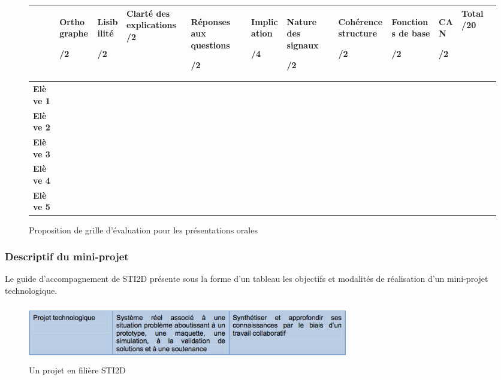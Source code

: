 \documentclass[12pt]{article}
\begin{document}
\begin{figure}[!h]
\hspace{-40pt}
\begin{tabular}%
{|>{\bfseries}l|p{1.8cm}|p{1.5cm}|p{1.5cm}|p{1.5cm}||p{1.5cm}|p{1.5cm}|p{1.5cm}|p{1.5cm}|p{1.5cm}|p{1.5cm}|p{1.5cm}|} \cline{2-11}
\multicolumn{1}{c|}{} & \scriptsize Orthographe \par \centering/2 &
\scriptsize Lisibilité \par \centering /2 &\scriptsize Clarté des explications  /2 & \scriptsize Réponses aux questions \par \centering /2 &\scriptsize Implication \par \centering /4 &\scriptsize Nature des signaux \par \centering /2 & \scriptsize Cohérence structure \par \centering /2 &\scriptsize Fonctions de base  \par \centering /2 & \scriptsize CAN \par \centering /2 & \scriptsize Total /20\\ \hline
Elève 1 & &&&&&&&&&   \\\hline Elève 2 &  & &&&&&&&&  \\\hline Elève 3 & & &&&&&&&& \\\hline Elève 4 & & &&&&&&&& \\\hline Elève 5 & & &&&&&&&& \\\hline \end{tabular}
\caption{Proposition de grille d'évaluation pour les présentations orales}
\end{figure}

\newpage

\subsubsection{Descriptif du mini-projet}

Le guide d'accompagnement de STI2D présente sous la forme d'un tableau les objectifs et modalités de réalisation d'un mini-projet technologique.\par
\vspace{10pt}

\begin{figure}[!h]
\centering
\includegraphics[width=14cm,height=2.5cm,trim=0cm 0cm 0cm 0cm, clip=true]{Images_Rapport/projet}
\caption{Un projet en filière STI2D}
\end{figure}
\end{document}
